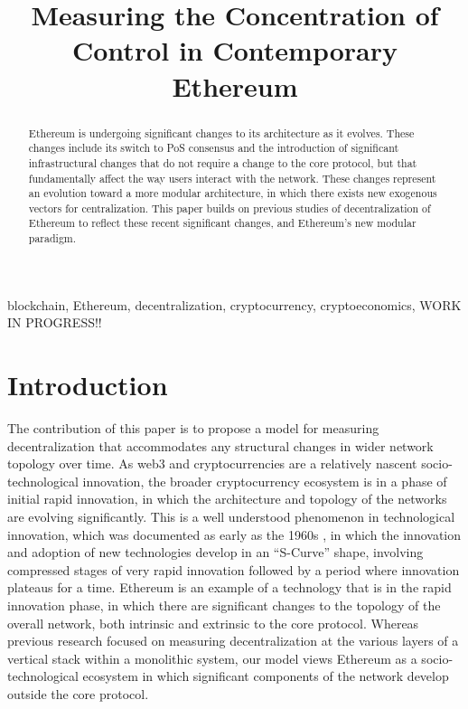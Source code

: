 \documentclass[conference]{IEEEtran}
\begin{document}
\title{Measuring the Concentration of Control in Contemporary Ethereum}

\author{
}

\maketitle

\begin{abstract}
Ethereum is undergoing significant changes to its architecture as it evolves.  These changes include its switch to PoS consensus and the introduction of significant infrastructural changes that do not require a change to the core protocol, but that fundamentally affect the way users interact with the network.  These changes represent an evolution toward a more modular architecture, in which there exists new exogenous vectors for centralization.  This paper builds on previous studies of decentralization of Ethereum to reflect these recent significant changes, and Ethereum's new modular paradigm.
\end{abstract}

\begin{IEEEkeywords}
blockchain, Ethereum, decentralization, cryptocurrency, cryptoeconomics, WORK IN PROGRESS!!
\end{IEEEkeywords}

\section{Introduction}

The contribution of this paper is to propose a model for measuring decentralization that accommodates any structural changes in wider network topology over time.  As web3 and cryptocurrencies are a relatively nascent socio-technological innovation, the broader cryptocurrency ecosystem is in a phase of initial rapid innovation, in which the architecture and topology of the networks are evolving significantly.  This is a well understood phenomenon in technological innovation, which was documented as early as the 1960s \cite{rogers2010diffusion}, in which the innovation and adoption of new technologies develop in an “S-Curve” shape, involving compressed stages of very rapid innovation followed by a period where innovation plateaus for a time.  Ethereum is an example of a technology that is in the rapid innovation phase, in which there are significant changes to the topology of the overall network, both intrinsic and extrinsic to the core protocol.  Whereas previous research \cite{gochhayat2020measuring, lin2021measuring, karakostas2022sok} focused on measuring decentralization at the various layers of a vertical stack within a monolithic system, our model views Ethereum as a socio-technological ecosystem in which significant components of the network develop outside the core protocol.
\end{document}

